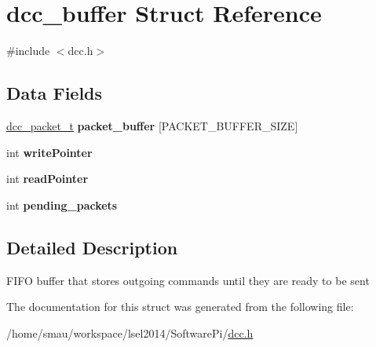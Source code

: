 \hypertarget{structdcc__buffer}{\section{dcc\-\_\-buffer Struct Reference}
\label{structdcc__buffer}
}


{\ttfamily \#include $<$dcc.\-h$>$}

\subsection*{Data Fields}
\begin{DoxyCompactItemize}
\item 
\hypertarget{structdcc__buffer_a46fe437a3f0e2e4b15b69e0199e1c2a4}{\hyperlink{structdcc__packet__t}{dcc\-\_\-packet\-\_\-t} {\bfseries packet\-\_\-buffer} \mbox{[}P\-A\-C\-K\-E\-T\-\_\-\-B\-U\-F\-F\-E\-R\-\_\-\-S\-I\-Z\-E\mbox{]}}\label{structdcc__buffer_a46fe437a3f0e2e4b15b69e0199e1c2a4}

\item 
\hypertarget{structdcc__buffer_a8709c2b93103afb40d4aa2b6762d860f}{int {\bfseries write\-Pointer}}\label{structdcc__buffer_a8709c2b93103afb40d4aa2b6762d860f}

\item 
\hypertarget{structdcc__buffer_a5bc811d9712cc7f68e7935cb1052cf6f}{int {\bfseries read\-Pointer}}\label{structdcc__buffer_a5bc811d9712cc7f68e7935cb1052cf6f}

\item 
\hypertarget{structdcc__buffer_af48034857c3e2729673f202f4f519748}{int {\bfseries pending\-\_\-packets}}\label{structdcc__buffer_af48034857c3e2729673f202f4f519748}

\end{DoxyCompactItemize}


\subsection{Detailed Description}
F\-I\-F\-O buffer that stores outgoing commands until they are ready to be sent 

The documentation for this struct was generated from the following file\-:\begin{DoxyCompactItemize}
\item 
/home/smau/workspace/lsel2014/\-Software\-Pi/\hyperlink{dcc_8h}{dcc.\-h}\end{DoxyCompactItemize}
